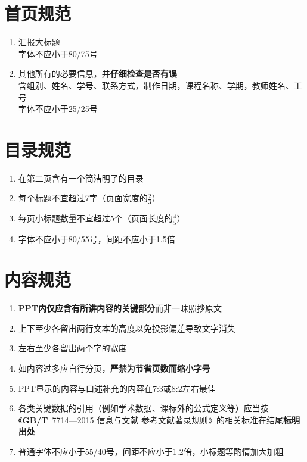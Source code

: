 \section[首页规范]{首页规范}
\begin{enumerate}
    \item 汇报大标题\\
          字体不应小于80/75号
    \item 其他所有的必要信息，并\textbf{仔细检查是否有误}\\
          含组别、姓名、学号、联系方式，制作日期，课程名称、学期，教师姓名、工号\\
          字体不应小于25/25号
\end{enumerate}

\section[目录规范]{目录规范}
\begin{enumerate}
    \item 在第二页含有一个简洁明了的目录
    \item 每个标题不宜超过7字（页面宽度的$\frac{2}{3}$）
    \item 每页小标题数量不宜超过5个（页面长度的$\frac{4}{5}$）
    \item 字体不应小于80/55号，间距不应小于1.5倍
\end{enumerate}

\section[内容规范]{内容规范}
\begin{enumerate}
    \item \textbf{PPT内仅应含有所讲内容的关键部分}而非一昧照抄原文
    \item 上下至少各留出两行文本的高度以免投影偏差导致文字消失
    \item 左右至少各留出两个字的宽度
    \item 如内容过多应自行分页，\textbf{严禁为节省页数而缩小字号}
    \item PPT显示的内容与口述补充的内容在7:3或8:2左右最佳
    \item 各类关键数据的引用（例如学术数据、课标外的公式定义等）应当按\\《\textbf{GB/T}\ 7714—2015 信息与文献 参考文献著录规则》的相关标准在结尾\textbf{标明出处}
    \item 普通字体不应小于55/40号，间距不应小于1.2倍，小标题等酌情加大加粗
\end{enumerate}

